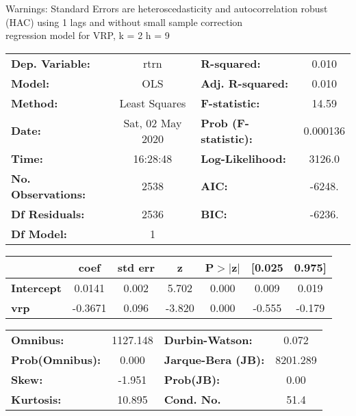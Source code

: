 Warnings: \newline
 [1] Standard Errors are heteroscedasticity and autocorrelation robust (HAC) using 1 lags and without small sample correction\\ 

regression model for VRP, k = 2 h = 9\begin{center}
\begin{tabular}{lclc}
\toprule
\textbf{Dep. Variable:}    &       rtrn       & \textbf{  R-squared:         } &     0.010   \\
\textbf{Model:}            &       OLS        & \textbf{  Adj. R-squared:    } &     0.010   \\
\textbf{Method:}           &  Least Squares   & \textbf{  F-statistic:       } &     14.59   \\
\textbf{Date:}             & Sat, 02 May 2020 & \textbf{  Prob (F-statistic):} &  0.000136   \\
\textbf{Time:}             &     16:28:48     & \textbf{  Log-Likelihood:    } &    3126.0   \\
\textbf{No. Observations:} &        2538      & \textbf{  AIC:               } &    -6248.   \\
\textbf{Df Residuals:}     &        2536      & \textbf{  BIC:               } &    -6236.   \\
\textbf{Df Model:}         &           1      & \textbf{                     } &             \\
\bottomrule
\end{tabular}
\begin{tabular}{lcccccc}
                   & \textbf{coef} & \textbf{std err} & \textbf{z} & \textbf{P$> |$z$|$} & \textbf{[0.025} & \textbf{0.975]}  \\
\midrule
\textbf{Intercept} &       0.0141  &        0.002     &     5.702  &         0.000        &        0.009    &        0.019     \\
\textbf{vrp}       &      -0.3671  &        0.096     &    -3.820  &         0.000        &       -0.555    &       -0.179     \\
\bottomrule
\end{tabular}
\begin{tabular}{lclc}
\textbf{Omnibus:}       & 1127.148 & \textbf{  Durbin-Watson:     } &    0.072  \\
\textbf{Prob(Omnibus):} &   0.000  & \textbf{  Jarque-Bera (JB):  } & 8201.289  \\
\textbf{Skew:}          &  -1.951  & \textbf{  Prob(JB):          } &     0.00  \\
\textbf{Kurtosis:}      &  10.895  & \textbf{  Cond. No.          } &     51.4  \\
\bottomrule
\end{tabular}
\end{center}

